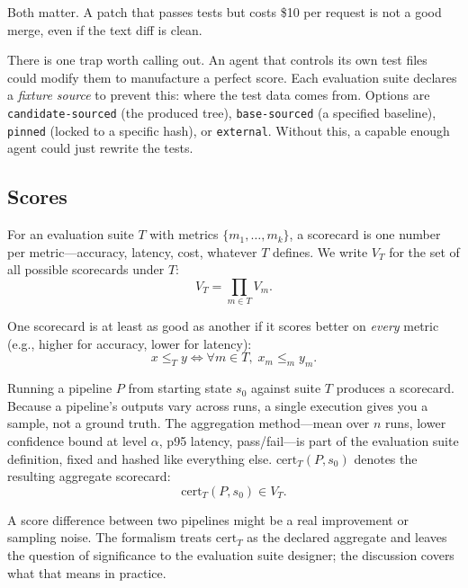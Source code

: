 \documentclass{article}
\begin{document}
\noindent Both matter. A patch that passes tests but costs \$10 per request
is not a good merge, even if the text diff is clean.

There is one trap worth calling out. An agent that controls its own test files
could modify them to manufacture a perfect score. Each evaluation suite
declares a \emph{fixture source} to prevent this: where the test data comes
from. Options are \texttt{candidate-sourced} (the produced tree),
\texttt{base-sourced} (a specified baseline), \texttt{pinned} (locked to a
specific hash), or \texttt{external}. Without this, a capable enough agent
could just rewrite the tests.

\subsection{Scores}

For an evaluation suite $T$ with metrics $\{m_1, \ldots, m_k\}$, a scorecard
is one number per metric---accuracy, latency, cost, whatever $T$ defines. We
write $V_T$ for the set of all possible scorecards under $T$:
\begin{equation}
  V_T = \prod_{m \in T} V_m.
\end{equation}

One scorecard is at least as good as another if it scores better on
\emph{every} metric (e.g., higher for accuracy, lower for latency):
\begin{equation}
  x \leq_T y \iff \forall m \in T,\; x_m \leq_m y_m.
\end{equation}

Running a pipeline $P$ from starting state $s_0$ against suite $T$ produces a
scorecard. Because a pipeline's outputs vary across runs, a single execution
gives you a sample, not a ground truth. The aggregation method---mean over $n$
runs, lower confidence bound at level $\alpha$, p95 latency, pass/fail---is
part of the evaluation suite definition, fixed and hashed like everything else.
$\text{cert}_T(P, s_0)$ denotes the resulting aggregate scorecard:
\begin{equation}
  \text{cert}_T(P, s_0) \in V_T.
\end{equation}

A score difference between two pipelines might be a real improvement or
sampling noise. The formalism treats $\text{cert}_T$ as the declared aggregate
and leaves the question of significance to the evaluation suite designer; the
discussion covers what that means in practice.
\end{document}
